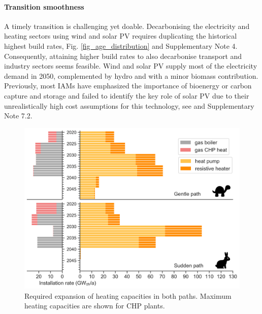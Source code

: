 \documentclass[5p]{elsarticle} %
\begin{document}
\paragraph{\textbf{Transition smoothness}} A timely transition is challenging yet doable. Decarbonising the electricity and heating sectors using wind and solar PV requires duplicating the historical highest build rates, Fig. \ref{fig_age_distribution} and Supplementary Note 4. Consequently, attaining higher build rates to also decarbonise transport and industry sectors seems feasible. Wind and solar PV supply most of the electricity demand in 2050, complemented by hydro and with a minor biomass contribution. Previously, most IAMs have emphasized the importance of bioenergy or carbon capture and storage and failed to identify the key role of solar PV due to their unrealistically high cost assumptions for this technology, see \cite{Creutzig_2017, Krey_2019} and Supplementary Note 7.2. \\

\begin{figure}[!h]
\centering
\includegraphics[width=\columnwidth]{figures/heating_expansion_Base.png}
\caption{Required expansion of heating capacities in both paths. Maximum heating capacities are shown for CHP plants.} \label{fig_heating_expansion} 
\end{figure}
\end{document}
